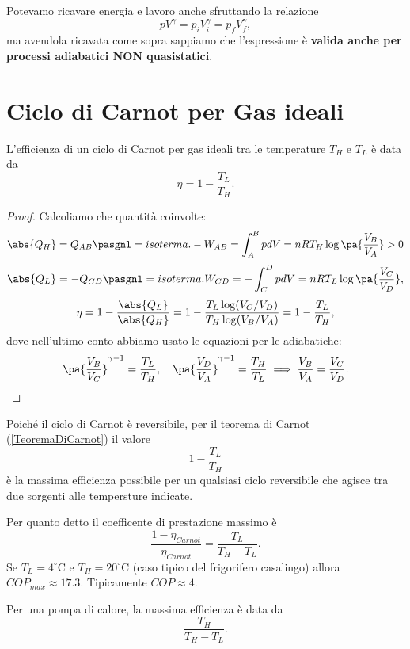 \begin{remark}
Potevamo ricavare energia e lavoro anche sfruttando la relazione \[pV^\gamma=p_iV_i^\gamma=p_fV_f^\gamma,\] ma avendola ricavata come sopra sappiamo che l'espressione \`e \textbf{valida anche per processi adiabatici NON quasistatici}.
\end{remark}

\section{Ciclo di Carnot per Gas ideali}

\begin{proposition}\label{EfficienzaCicloCarnot}
L'efficienza di un ciclo di Carnot per gas ideali tra le temperature $T_H$ e $T_L$ \`e data da
\[\eta=1-\frac{T_L}{T_H}.\]
\end{proposition}
\begin{proof}
Calcoliamo che quantit\`a coinvolte:
\[\abs{Q_H}=Q_{AB}\pasgnl={isoterma.}-W_{AB}=\int_A^BpdV=nRT_H\log\pa{\frac{V_B}{V_A}}>0\]
\[\abs{Q_L}=-Q_{CD}\pasgnl={isoterma.}W_{CD}=-\int_C^DpdV=nRT_L\log\pa{\frac{V_C}{V_D}},\]
\[\eta=1-\frac{\abs{Q_L}}{\abs{Q_H}}=1-\frac{T_L\log(V_C/V_D)}{T_H\log(V_B/V_A)}=1-\frac{T_L}{T_H},\]
dove nell'ultimo conto abbiamo usato le equazioni per le adiabatiche:
\[\pa{\frac{V_B}{V_C}}^{\gamma-1}=\frac{T_L}{T_H},\quad \pa{\frac{V_D}{V_A}}^{\gamma-1}=\frac{T_H}{T_L}\implies \frac{V_B}{V_A}=\frac{V_C}{V_D}.\]
\end{proof}

\begin{remark}
Poich\'e il ciclo di Carnot \`e reversibile, per il teorema di Carnot (\ref{TeoremaDiCarnot}) il valore
\[1-\frac{T_L}{T_H}\]
\`e la massima efficienza possibile per un qualsiasi ciclo reversibile che agisce tra due sorgenti alle tempersture indicate.
\end{remark}

\begin{remark}
Per quanto detto il coefficente di prestazione massimo \`e
\[\frac{1-\eta_{Carnot}}{\eta_{Carnot}}= \frac{T_L}{T_H-T_L}.\]
Se $T_L=4^\circ\mathrm{C}$ e $T_H=20^\circ\mathrm{C}$ (caso tipico del frigorifero casalingo) allora $COP_{max}\approx 17.3$. Tipicamente $COP\approx 4$.
\end{remark}
\begin{remark}
Per una pompa di calore, la massima efficienza \`e data da
\[\frac{T_H}{T_H-T_L}.\]
\end{remark}


